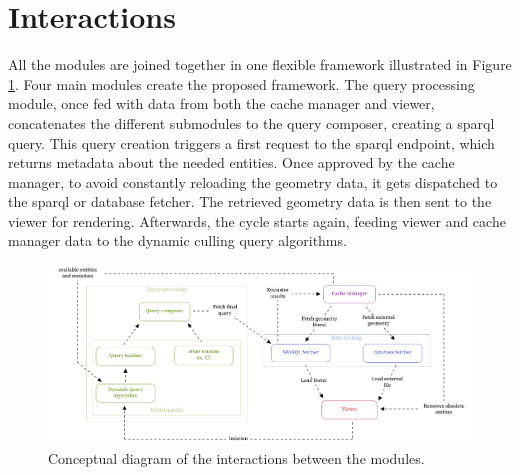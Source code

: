 \section{Interactions} \label{sec:interactions}
All the modules are joined together in one flexible framework illustrated in Figure \ref{fig:interactionModules}. Four main modules create the proposed framework. The query processing module, once fed with data from both the cache manager and viewer, concatenates the different submodules to the query composer, creating a \ac{sparql} query. This query creation triggers a first request to the \ac{sparql} endpoint, which returns metadata about the needed entities. Once approved by the cache manager, to avoid constantly reloading the geometry data, it gets dispatched to the \ac{sparql} or database fetcher. The retrieved geometry data is then sent to the viewer for rendering. Afterwards, the cycle starts again, feeding viewer and cache manager data to the dynamic culling query algorithms.

\begin{figure}[H]
    \centering
    \includegraphics[width=\textwidth]{figures/pdf/interactions_concept.pdf}
    \caption[Interactions modular framework]{Conceptual diagram of the interactions between the modules.}
    \label{fig:interactionModules}
\end{figure}
